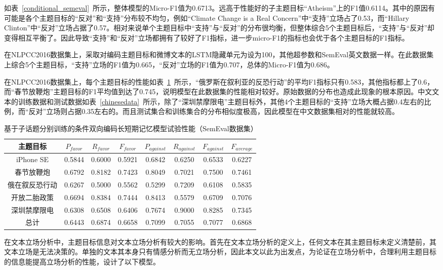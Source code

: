 如表~\ref{conditional_semeval}~所示，整体模型的Micro-F1值为0.6713。远高于性能好的子主题目标“Atheism”上的F1值0.6114。其中的原因有可能是各个主题目标的“反对”和“支持”分布较不均匀，例如“Climate Change is a Real Concern”中“支持”立场占了0.53，而“Hillary Clinton”中“反对”立场占据了0.57。相对来说单个主题目标中“支持”与“反对”的分布很均衡，但整体综合5个主题目标后，“支持”与“反对”却变得相互平衡了。因此导致“支持”和“反对”立场都拥有了较好了F1指标，进一步micro-F1的指标也会优于各个主题目标的F1指标。

在NLPCC2016数据集上，采取对编码主题目标和微博文本的LSTM隐藏单元为设为100，其他超参数和SemEval英文数据一样。在此数据集上综合5个主题目标，“支持”立场的F1值为0.665，“反对”立场的F1值为0.707，总体的Micro-F1值为0.686。

在NLPCC2016数据集上，每个主题目标的性能如表~\ref{chinese_condition}~所示，“俄罗斯在叙利亚的反恐行动”的平均F1指标只有0.583，其他指标都上了0.6，而“春节放鞭炮”主题目标的F1平均值到达了0.745，说明模型在此数据集的性能相对较好。原始数据的分布也造成此现象的根本原因。中文文本的训练数据和测试数据如表~\ref{chinesedata}~所示，除了“深圳禁摩限电”主题目标外，其他4个主题目标的“支持”立场大概占据0.4左右的比例，而“反对”立场则占据0.35左右的。而且测试集合和训练集合的分布相似度极高，因此模型在中文数据集相对的性能就较高。
\begin{table}[htbp]
	\caption[table123]{基于子话题分别训练的条件双向编码长短期记忆模型试验性能（SemEval数据集）}
	\label{chinese_condition}
	\vspace{0.5em}\centering\wuhao
	\begin{tabular}{cccccccc}
		\toprule[1.5pt]
	主题目标& $P_{favor}$&$R_{favor}$&$F_{favor}$&$P_{against}$&$R_{against}$&$F_{against}$&$F_{average}$ \\
		\midrule[1pt]
		iPhone SE&0.5844&0.6000&0.5921&0.6842&0.6250&0.6533&0.6227\\
		春节放鞭炮&0.6792&0.8182&0.7423&0.8049&0.7021&0.7500&0.7461\\
		俄在叙反恐行动&0.6267&0.5000&0.5562&0.5299&0.7209&0.6108&0.5835\\
		开放二胎政策&0.6694&0.8384&0.7444&0.8413&0.5579&0.6709&0.7076\\
		深圳禁摩限电&0.6308&0.6508&0.6406&0.7674&0.9000&0.8285&0.7345\\
		总计&0.6443&0.6874&0.6658&0.7099&0.7055&0.7077&0.6868\\
		\bottomrule[1.5pt]
	\end{tabular}
\end{table}

在文本立场分析中，主题目标信息对文本立场分析有较大的影响。首先在文本立场分析的定义上，任何文本在其主题目标未定义清楚前，其文本立场是无法决策的。单独的文本其本身只有情感分析而无立场分析，因此本文以此为出发点，为论证在立场分析中，合理利用主题目标的信息能提高立场分析的性能，设计了以下模型。

